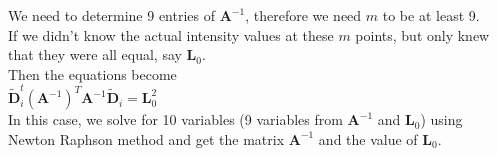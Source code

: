 \documentclass[11pt]{article}
\begin{document}
\begin{enumerate}
We need to determine 9 entries of $\mathbf{A}^{-1}$, therefore we need $m$ to be at least 9.\\

If we didn't know the actual intensity values at these $m$ points, but only knew that they were all equal, say $\mathbf{L}_{0}$. \\
Then the equations become \\
$\mathbf{\tilde{D}}_i^t(\mathbf{A}^{-1})^{T}\mathbf{A}^{-1}\mathbf{\tilde{D}}_i = \mathbf{L}_{0}^{2}$ \\
In this case, we solve for 10 variables (9 variables from $\mathbf{A}^{-1}$ and $\mathbf{L}_{0}$) using Newton Raphson method and get the matrix $\mathbf{A}^{-1}$ and the value of $\mathbf{L}_{0}$.\\
\end{enumerate}
\end{document}
